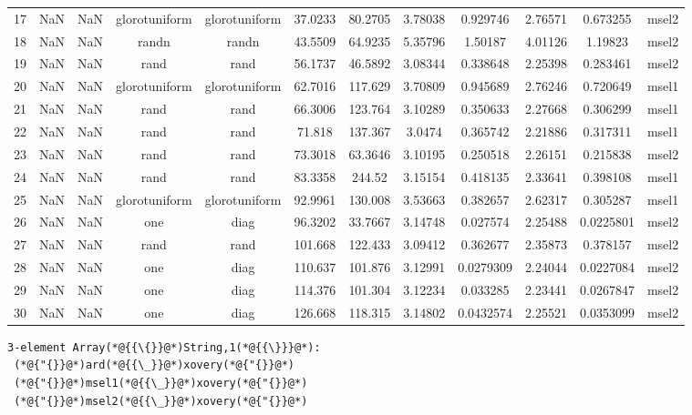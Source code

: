 \documentclass[12pt,a4paper]{article}
\begin{document}
\begin{tabular}{r|ccccccccccc}
	17 & NaN & NaN & glorotuniform & glorotuniform & 37.0233 & 80.2705 & 3.78038 & 0.929746 & 2.76571 & 0.673255 & msel2 \\
	18 & NaN & NaN & randn & randn & 43.5509 & 64.9235 & 5.35796 & 1.50187 & 4.01126 & 1.19823 & msel2 \\
	19 & NaN & NaN & rand & rand & 56.1737 & 46.5892 & 3.08344 & 0.338648 & 2.25398 & 0.283461 & msel2 \\
	20 & NaN & NaN & glorotuniform & glorotuniform & 62.7016 & 117.629 & 3.70809 & 0.945689 & 2.76246 & 0.720649 & msel1 \\
	21 & NaN & NaN & rand & rand & 66.3006 & 123.764 & 3.10289 & 0.350633 & 2.27668 & 0.306299 & msel1 \\
	22 & NaN & NaN & rand & rand & 71.818 & 137.367 & 3.0474 & 0.365742 & 2.21886 & 0.317311 & msel1 \\
	23 & NaN & NaN & rand & rand & 73.3018 & 63.3646 & 3.10195 & 0.250518 & 2.26151 & 0.215838 & msel2 \\
	24 & NaN & NaN & rand & rand & 83.3358 & 244.52 & 3.15154 & 0.418135 & 2.33641 & 0.398108 & msel1 \\
	25 & NaN & NaN & glorotuniform & glorotuniform & 92.9961 & 130.008 & 3.53663 & 0.382657 & 2.62317 & 0.305287 & msel1 \\
	26 & NaN & NaN & one & diag & 96.3202 & 33.7667 & 3.14748 & 0.027574 & 2.25488 & 0.0225801 & msel2 \\
	27 & NaN & NaN & rand & rand & 101.668 & 122.433 & 3.09412 & 0.362677 & 2.35873 & 0.378157 & msel2 \\
	28 & NaN & NaN & one & diag & 110.637 & 101.876 & 3.12991 & 0.0279309 & 2.24044 & 0.0227084 & msel2 \\
	29 & NaN & NaN & one & diag & 114.376 & 101.304 & 3.12234 & 0.033285 & 2.23441 & 0.0267847 & msel2 \\
	30 & NaN & NaN & one & diag & 126.668 & 118.315 & 3.14802 & 0.0432574 & 2.25521 & 0.0353099 & msel2 \\
\end{tabular}


\begin{lstlisting}
3-element Array(*@{{\{}}@*)String,1(*@{{\}}}@*):
 (*@{"{}}@*)ard(*@{{\_}}@*)xovery(*@{"{}}@*)
 (*@{"{}}@*)msel1(*@{{\_}}@*)xovery(*@{"{}}@*)
 (*@{"{}}@*)msel2(*@{{\_}}@*)xovery(*@{"{}}@*)
\end{lstlisting}
\end{document}
